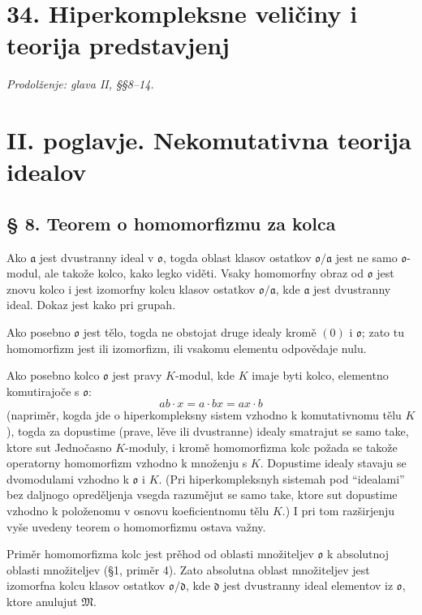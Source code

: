 \documentclass[11pt]{article}
\providecommand{\mM}{\mathfrak{M}}
\providecommand{\ma}{\mathfrak{a}}
\providecommand{\md}{\mathfrak{d}}
\providecommand{\mo}{\mathfrak{o}}
\begin{document}
\setcounter{footnote}{12}
\section*{34. Hiperkompleksne veličiny i teorija predstavjenj}
\emph{Prodolženje: glava II, §§8--14.}

\section*{II. poglavje. Nekomutativna teorija idealov}

\subsection*{§ 8. Teorem o homomorfizmu za kolca}

Ako $\ma$ jest dvustranny ideal v $\mo$, togda oblast klasov ostatkov $\mo/\ma$ jest ne samo $\mo$-modul, ale takože kolco, kako legko viděti. Vsaky homomorfny obraz od $\mo$ jest znovu kolco i jest izomorfny kolcu klasov ostatkov $\mo/\ma$, kde $\ma$ jest dvustranny ideal. Dokaz jest kako pri grupah.

Ako posebno $\mo$ jest tělo, togda ne obstojat druge idealy kromě $(0)$ i $\mo$; zato tu homomorfizm jest ili izomorfizm, ili vsakomu elementu odpovědaje nulu.

Ako posebno kolco $\mo$ jest pravy $K$-modul, kde $K$ imaje byti kolco, elementno komutirajoče s $\mo$:
\[
        ab\cdot x=a\cdot bx=ax\cdot b
\]
(napriměr, kogda jde o hiperkompleksny sistem vzhodno k komutativnomu tělu $K$), togda za dopustime (prave, lěve ili dvustranne) idealy smatrajut se samo take, ktore sut Jednočasno $K$-moduly, i kromě homomorfizma kolc požada se takože operatorny homomorfizm vzhodno k množenju s $K$. Dopustime idealy stavaju se dvomodulami vzhodno k $\mo$ i $K$. (Pri hiperkompleksnyh sistemah pod ``idealami'' bez daljnogo opreděljenja vsegda razumějut se samo take, ktore sut dopustime vzhodno k položenomu v osnovu koeficientnomu tělu $K$.) I pri tom razširjenju vyše uvedeny teorem o homomorfizmu ostava važny.

Priměr homomorfizma kolc jest prěhod od oblasti množiteljev $\mo$ k absolutnoj oblasti množiteljev (§1, priměr 4). Zato absolutna oblast množiteljev jest izomorfna kolcu klasov ostatkov $\mo/\md$, kde $\md$ jest dvustranny ideal elementov iz $\mo$, ktore anulujut $\mM$.
\end{document}
